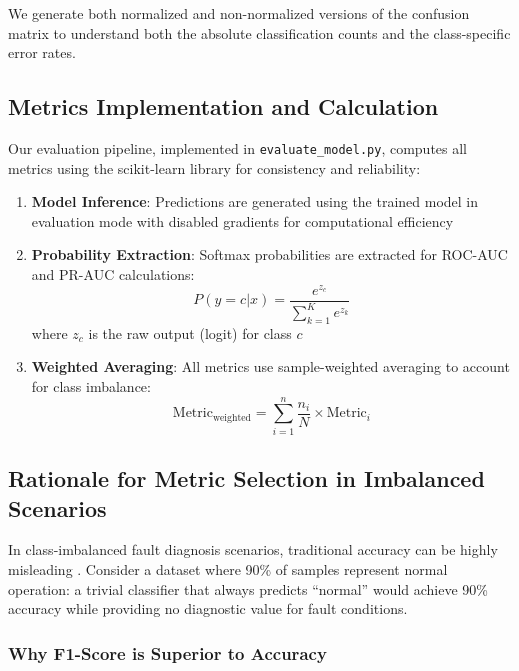 We generate both normalized and non-normalized versions of the confusion matrix to understand both the absolute classification counts and the class-specific error rates.

\subsection{Metrics Implementation and Calculation}
\label{subsec:metrics_implementation}

Our evaluation pipeline, implemented in \texttt{evaluate\_model.py}, computes all metrics using the scikit-learn library for consistency and reliability:

\begin{enumerate}
    \item \textbf{Model Inference}: Predictions are generated using the trained model in evaluation mode with disabled gradients for computational efficiency
    
    \item \textbf{Probability Extraction}: Softmax probabilities are extracted for ROC-AUC and PR-AUC calculations:
    \begin{equation}
    P(y = c | x) = \frac{e^{z_c}}{\sum_{k=1}^{K} e^{z_k}}
    \end{equation}
    where $z_c$ is the raw output (logit) for class $c$
    
    \item \textbf{Weighted Averaging}: All metrics use sample-weighted averaging to account for class imbalance:
    \begin{equation}
    \text{Metric}_{\text{weighted}} = \sum_{i=1}^{n} \frac{n_i}{N} \times \text{Metric}_i
    \end{equation}
\end{enumerate}

\subsection{Rationale for Metric Selection in Imbalanced Scenarios}
\label{subsec:metric_rationale}

In class-imbalanced fault diagnosis scenarios, traditional accuracy can be highly misleading \citep{he2009learning, krawczyk2016learning}. Consider a dataset where 90\% of samples represent normal operation: a trivial classifier that always predicts ``normal'' would achieve 90\% accuracy while providing no diagnostic value for fault conditions.

\subsubsection{Why F1-Score is Superior to Accuracy}
\label{subsubsec:f1_superiority}

